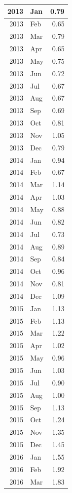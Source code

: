 \documentclass[
]{article}
\begin{document}
\begin{table}[H]
\begin{tabular}[t]{r|l|r}
\hline
2013 & Jan & 0.79\\
\hline
2013 & Feb & 0.65\\
\hline
2013 & Mar & 0.79\\
\hline
2013 & Apr & 0.65\\
\hline
2013 & May & 0.75\\
\hline
2013 & Jun & 0.72\\
\hline
2013 & Jul & 0.67\\
\hline
2013 & Aug & 0.67\\
\hline
2013 & Sep & 0.69\\
\hline
2013 & Oct & 0.81\\
\hline
2013 & Nov & 1.05\\
\hline
2013 & Dec & 0.79\\
\hline
2014 & Jan & 0.94\\
\hline
2014 & Feb & 0.67\\
\hline
2014 & Mar & 1.14\\
\hline
2014 & Apr & 1.03\\
\hline
2014 & May & 0.88\\
\hline
2014 & Jun & 0.82\\
\hline
2014 & Jul & 0.73\\
\hline
2014 & Aug & 0.89\\
\hline
2014 & Sep & 0.84\\
\hline
2014 & Oct & 0.96\\
\hline
2014 & Nov & 0.81\\
\hline
2014 & Dec & 1.09\\
\hline
2015 & Jan & 1.13\\
\hline
2015 & Feb & 1.13\\
\hline
2015 & Mar & 1.22\\
\hline
2015 & Apr & 1.02\\
\hline
2015 & May & 0.96\\
\hline
2015 & Jun & 1.03\\
\hline
2015 & Jul & 0.90\\
\hline
2015 & Aug & 1.00\\
\hline
2015 & Sep & 1.13\\
\hline
2015 & Oct & 1.24\\
\hline
2015 & Nov & 1.35\\
\hline
2015 & Dec & 1.45\\
\hline
2016 & Jan & 1.55\\
\hline
2016 & Feb & 1.92\\
\hline
2016 & Mar & 1.83\\

\end{tabular}
\end{table}
\end{document}
